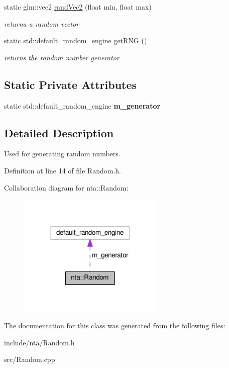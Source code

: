 \begin{DoxyCompactItemize}
static glm\+::vec2 \hyperlink{classnta_1_1Random_ac4fdaa10f7d4646d4489933b48aca148}{rand\+Vec2} (float min, float max)
\begin{DoxyCompactList}\small\item\em returna a random vector \end{DoxyCompactList}\item 
\mbox{\label{classnta_1_1Random_a70719bc927413d2df83593c243499c88}} 
static std\+::default\+\_\+random\+\_\+engine \hyperlink{classnta_1_1Random_a70719bc927413d2df83593c243499c88}{get\+R\+NG} ()
\begin{DoxyCompactList}\small\item\em returns the random number generator \end{DoxyCompactList}\end{DoxyCompactItemize}
\subsection*{Static Private Attributes}
\begin{DoxyCompactItemize}
\item 
\mbox{\label{classnta_1_1Random_ae9a96e05f269c06af6c8dda212dae11a}} 
static std\+::default\+\_\+random\+\_\+engine {\bfseries m\+\_\+generator}
\end{DoxyCompactItemize}


\subsection{Detailed Description}
Used for generating random numbers. 

Definition at line 14 of file Random.\+h.



Collaboration diagram for nta\+:\+:Random\+:\nopagebreak
\begin{figure}[H]
\begin{center}
\leavevmode
\includegraphics[width=197pt]{de/dda/classnta_1_1Random__coll__graph}
\end{center}
\end{figure}


The documentation for this class was generated from the following files\+:\begin{DoxyCompactItemize}
\item 
include/nta/Random.\+h\item 
src/Random.\+cpp\end{DoxyCompactItemize}
